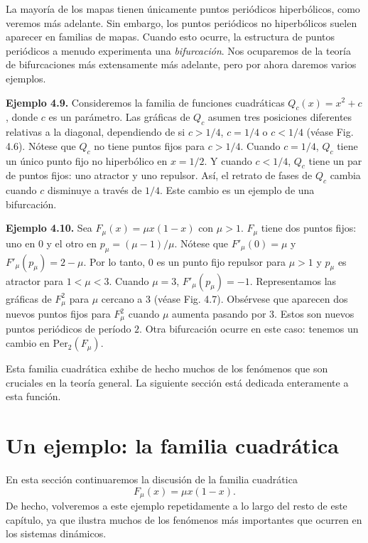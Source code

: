 \documentclass[10pt,a4paper]{book}
\begin{document}
\medskip

La mayoría de los mapas tienen únicamente puntos periódicos hiperbólicos, como veremos más adelante. Sin embargo, los puntos periódicos no hiperbólicos suelen aparecer en familias de mapas. Cuando esto ocurre, la estructura de puntos periódicos a menudo experimenta una \emph{bifurcación}. Nos ocuparemos de la teoría de bifurcaciones más extensamente más adelante, pero por ahora daremos varios ejemplos.

\newpage

\textbf{Ejemplo 4.9.} Consideremos la familia de funciones cuadráticas $Q_{c}(x)=x^{2}+c$, donde $c$ es un parámetro. Las gráficas de $Q_{c}$ asumen tres posiciones diferentes relativas a la diagonal, dependiendo de si $c>1/4$, $c=1/4$ o $c<1/4$ (véase Fig. 4.6). Nótese que $Q_{c}$ no tiene puntos fijos para $c>1/4$. Cuando $c=1/4$, $Q_{c}$ tiene un único punto fijo no hiperbólico en $x=1/2$. Y cuando $c<1/4$, $Q_{c}$ tiene un par de puntos fijos: uno atractor y uno repulsor. Así, el retrato de fases de $Q_{c}$ cambia cuando $c$ disminuye a través de $1/4$. Este cambio es un ejemplo de una bifurcación.

\newpage

\textbf{Ejemplo 4.10.} Sea $F_{\mu}(x)=\mu x(1-x)$ con $\mu>1$. $F_{\mu}$ tiene dos puntos fijos: uno en $0$ y el otro en $p_{\mu}=(\mu-1)/\mu$. Nótese que $F'_{\mu}(0)=\mu$ y $F'_{\mu}(p_{\mu})=2-\mu$. Por lo tanto, $0$ es un punto fijo repulsor para $\mu>1$ y $p_{\mu}$ es atractor para $1<\mu<3$. Cuando $\mu=3$, $F'_{\mu}(p_{\mu})=-1$. Representamos las gráficas de $F_{\mu}^{2}$ para $\mu$ cercano a $3$ (véase Fig. 4.7). Obsérvese que aparecen dos nuevos puntos fijos para $F_{\mu}^{2}$ cuando $\mu$ aumenta pasando por $3$. Estos son nuevos puntos periódicos de período $2$.  Otra bifurcación ocurre en este caso: tenemos un cambio en $\mathrm{Per}_{2}(F_{\mu})$.  

\bigskip

Esta familia cuadrática exhibe de hecho muchos de los fenómenos que son cruciales en la teoría general.  
La siguiente sección está dedicada enteramente a esta función.

\newpage

\section{Un ejemplo: la familia cuadrática}

En esta sección continuaremos la discusión de la familia cuadrática 
\[
F_{\mu}(x) = \mu x (1-x).
\]
De hecho, volveremos a este ejemplo repetidamente a lo largo del resto de este capítulo, 
ya que ilustra muchos de los fenómenos más importantes que ocurren en los sistemas dinámicos.
\end{document}
